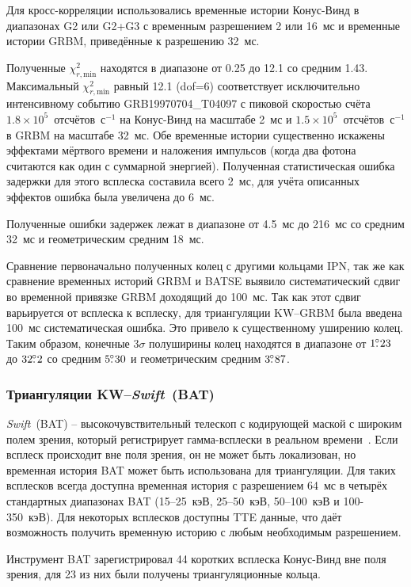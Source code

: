 Для кросс-корреляции использовались временные истории Конус-Винд в диапазонах G2 
или G2+G3 с временным разрешением 2 или 16~мс и временные истории GRBM, 
приведённые к разрешению 32~мс.

Полученные $\chi^2_{r,\textrm{min}}$ находятся в диапазоне от 0.25 до 12.1 со 
средним 1.43. Максимальный $\chi^2_{r,\textrm{min}}$ равный 12.1 (dof=6) 
соответствует исключительно интенсивному событию GRB19970704\_T04097 с пиковой 
скоростью счёта $1.8\times10^5$~отсчётов~с$^{-1}$ на Конус-Винд на масштабе 2~мс 
и $1.5\times10^5$~отсчётов~с$^{-1}$ в GRBM на масштабе 32~мс. Обе временные истории 
существенно искажены эффектами мёртвого времени и наложения импульсов 
(когда два фотона считаются как один с суммарной энергией). Полученная статистическая 
ошибка задержки для этого всплеска составила всего 2~мс, для учёта описанных 
эффектов ошибка была увеличена до 6~мс.

Полученные ошибки задержек лежат в диапазоне от 4.5~мс до 216~мс со средним 32~мс 
и геометрическим средним 18~мс.

Сравнение первоначально полученных колец с другими кольцами IPN, так же как 
сравнение временных историй GRBM и BATSE выявило систематический сдвиг во 
временной привязке GRBM доходящий до 100~мс. Так как этот сдвиг варьируется от 
всплеска к всплеску, для триангуляции KW--GRBM была введена 100~мс 
систематическая ошибка. Это привело к существенному уширению колец. Таким образом, 
конечные $3\sigma$ полуширины колец находятся в диапазоне от $1\mbox{$.\!\!^\circ$}23$ 
до $32\mbox{$.\!\!^\circ$}2$ со средним $5\mbox{$.\!\!^\circ$}30$ и геометрическим 
средним $3\mbox{$.\!\!^\circ$}87$.

\subsubsection{Триангуляции KW--\textit{Swift}~(BAT)}
\textit{Swift}~(BAT) -- высокочувствительный телескоп с кодирующей маской с 
широким полем зрения, который регистрирует гамма-всплески в реальном 
времени~\citep{Barthelmy_2005SSRv}. Если всплеск происходит вне поля зрения, 
он не может быть локализован, но временная история BAT может быть использована 
для триангуляции. Для таких всплесков всегда доступна временная история 
с разрешением 64~мс в четырёх стандартных диапазонах BAT (15--25~кэВ, 25--50~кэВ, 
50--100~кэВ и 100-350~кэВ). Для некоторых всплесков доступны TTE данные, что 
даёт возможность получить временную историю с любым необходимым разрешением.

Инструмент BAT зарегистрировал 44 коротких всплеска Конус-Винд вне поля зрения, 
для 23 из них были получены триангуляционные кольца.

